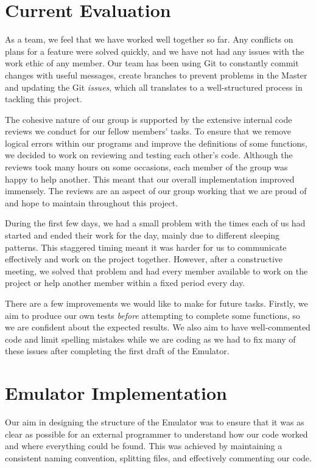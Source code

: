 \documentclass[10pt]{article}
\begin{document}
\section*{Current Evaluation}
As a team, we feel that we have worked well together so far. Any conflicts on plans for a feature were solved quickly, and we have not had any issues with the work ethic of any member. Our team has been using Git to constantly commit changes with useful messages, create branches to prevent problems in the Master and updating the Git \textsl{issues}, which all translates to a well-structured process in tackling this project.


The cohesive nature of our group is supported by the extensive internal code reviews we conduct for our fellow members’ tasks. To ensure that we remove logical errors within our programs and improve the definitions of some functions, we decided to work on reviewing and testing each other’s code. Although the reviews took many hours on some occasions, each member of the group was happy to help another. This meant that our overall implementation improved immensely. The reviews are an aspect of our group working that we are proud of and hope to maintain throughout this project.


During the first few days, we had a small problem with the times each of us had started and ended their work for the day, mainly due to different sleeping patterns. This staggered timing meant it was harder for us to communicate effectively and work on the project together. However, after a constructive meeting, we solved that problem and had every member available to work on the project or help another member within a fixed period every day. 


There are a few improvements we would like to make for future tasks. Firstly, we aim to produce our own tests \textsl{before} attempting to complete some functions, so we are confident about the expected results. We also aim to have well-commented code and limit spelling mistakes while we are coding as we had to fix many of these issues after completing the first draft of the Emulator.

\section*{Emulator Implementation}
Our aim in designing the structure of the Emulator was to ensure that it was as clear as possible for an external programmer to understand how our code worked and where everything could be found. This was achieved by maintaining a consistent naming convention, splitting files, and effectively commenting our code.
\end{document}

